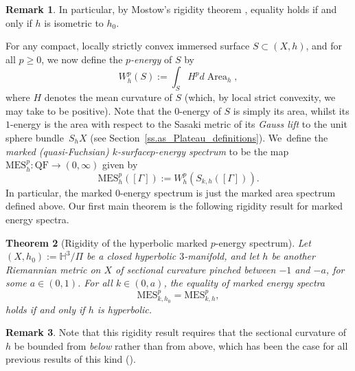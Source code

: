\documentclass[10pt]{amsart}
\newcommand{\ksurface}{$k$\nobreakdash-surface\xspace}
\theoremstyle{plain}
\newtheorem{theorem}{Theorem}[section]
\theoremstyle{definition}
\newtheorem{remark}[theorem]{Remark}
\newcommand\Hyp{\mathbb{H}^3}
\let\dans\subset
\newcommand{\QF}{\mathrm{QF}}
\DeclareMathOperator{\Area}{Area}
\begin{document}
\begin{remark} In particular, by Mostow's rigidity theorem \cite{Mostow}, equality holds if and only if $h$ is isometric to $h_0$.
\end{remark}

For any compact, locally strictly convex immersed surface $S\dans (X,h)$, and for all $p\geq 0$, we now define the \emph{$p$-energy} of $S$ by
\begin{equation}\label{eq.energy}
W^p_h(S):=\int_SH^pd\Area_h,
\end{equation}
where $H$ denotes the mean curvature of $S$ (which, by local strict convexity, we may take to be positive). Note that the $0$-energy of $S$ is simply its area, whilst its $1$-energy is the area with respect to the Sasaki metric of its \emph{Gauss lift} to the unit sphere bundle~$S_hX$ (see Section~\ref{ss.as_Plateau_definitions}). We~define the \emph{marked (quasi-Fuchsian) \ksurface $p$-energy spectrum} to be the map $\text{MES}_h^p:\QF\to(0,\infty)$ given by
\begin{equation}\label{eq.MarkedEnergySpectrum}
\text{MES}_h^p([\Gamma]) := W^p_h(S_{k,h}([\Gamma])).
\end{equation}
In particular, the marked $0$-energy spectrum is just the marked area spectrum defined above. Our first main theorem is the following rigidity result for marked energy spectra.

\begin{theorem}[Rigidity of the hyperbolic marked $p$-energy spectrum]\label{thm.Rigidity_hyp_energy_spectrum}
Let $(X,h_0):=\Hyp/\Pi$ be a closed hyperbolic $3$\nobreakdash-manifold, and let $h$ be another Riemannian metric on $X$ of sectional curvature pinched between $-1$ and $-a$, for some $a\in(0,1)$. For all $k\in(0,a)$, the equality of marked energy spectra
\begin{equation}\label{eqn.rigidity_energy}
\mathrm{MES}^p_{k,h_0}=\mathrm{MES}^p_{k,h},
\end{equation}
holds if and only if $h$ is hyperbolic.
\end{theorem}

\begin{remark}
Note that this rigidity result requires that the sectional curvature of~$h$ be bounded from \emph{below} rather than from above, which has been the case for all previous results of this kind (\cf \cite{ALS,CMN}).
\end{remark}
\end{document}
